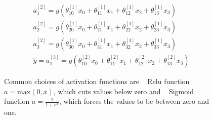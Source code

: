 \begin{equation}
\begin{split}
a_{ 1 }^{ [2] }=g(\theta _{ 10 }^{ [1] }x_{ 0 }+\theta _{ 11 }^{ [1]}x_{ 1 }+\theta _{ 12 }^{ [1] }x_{ 2 }+\theta _{ 13 }^{ [1] }x_{ 3 })\\ 
a_{ 2 }^{ [2] }=g(\theta _{ 20 }^{ [1] }x_{ 0 }+\theta _{ 21 }^{ [1] }x_{ 1 }+\theta _{ 22 }^{ [1] }x_{ 2 }+\theta _{ 23 }^{ [1] }x_{ 3 })\\
 a_{ 3 }^{ [2] }=g(\theta _{ 30 }^{ [1] }x_{ 0 }+\theta _{ 31 }^{ [1] }x_{ 1 }+\theta _{ 32 }^{ [1] }x_{ 2 }+\theta _{ 33 }^{ [1] }x_{ 3 })\\
  \hat { y } =a_{ 1 }^{ [3] }=g(\theta _{ 10 }^{ [2] }x_{ 0 }+\theta _{ 11 }^{ [2] }x_{ 1 }+\theta _{ 12 }^{ [2] }x_{ 2 }+\theta _{ 13 }^{ [2] }x_{ 3 })
\end{split}
\label{eq:nn_eq}
\end{equation}

\begin{figure}
\centering
{}
\caption{Common choices of activation functions are ~ Relu function $a=\mathrm{max}(0,x)$, which cuts values below zero and ~ Sigmoid function $a=\frac{1}{1+e^{x}}$, which forces the values to be between zero and one.}
\label{fig:activation}
\end{figure}
